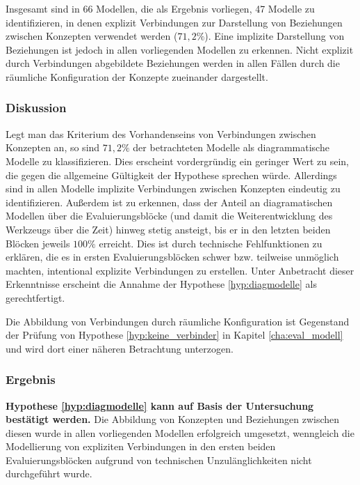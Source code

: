 Insgesamt sind in 66 Modellen, die als Ergebnis vorliegen, 47 Modelle zu identifizieren, in denen explizit Verbindungen zur Darstellung von Beziehungen zwischen Konzepten verwendet werden ($71,2\%$). Eine implizite Darstellung von Beziehungen ist jedoch in allen vorliegenden Modellen zu erkennen. Nicht explizit durch Verbindungen abgebildete Beziehungen werden in allen Fällen durch die räumliche Konfiguration der Konzepte zueinander dargestellt.

\subsubsection{Diskussion} %

Legt man das Kriterium des Vorhandenseins von Verbindungen zwischen Konzepten an, so sind $71,2\%$ der betrachteten Modelle als diagrammatische Modelle zu klassifizieren. Dies erscheint vordergründig ein geringer Wert zu sein, die gegen die allgemeine Gültigkeit der Hypothese sprechen würde. Allerdings sind in allen Modelle implizite Verbindungen zwischen Konzepten eindeutig zu identifizieren. Außerdem ist zu erkennen, dass der Anteil an diagramatischen Modellen über die Evaluierungsblöcke (und damit die Weiterentwicklung des Werkzeugs über die Zeit) hinweg stetig ansteigt, bis er in den letzten beiden Blöcken jeweils $100\%$ erreicht. Dies ist durch technische Fehlfunktionen zu erklären, die es in ersten Evaluierungsblöcken schwer bzw. teilweise unmöglich machten, intentional explizite Verbindungen zu erstellen. Unter Anbetracht dieser Erkenntnisse erscheint die Annahme der Hypothese \ref{hyp:diagmodelle} als gerechtfertigt.

Die Abbildung von Verbindungen durch räumliche Konfiguration ist Gegenstand der Prüfung von Hypothese \ref{hyp:keine_verbinder} in Kapitel \ref{cha:eval_modell} und wird dort einer näheren Betrachtung unterzogen.

\subsubsection{Ergebnis} %

\textbf{Hypothese \ref{hyp:diagmodelle} kann auf Basis der Untersuchung bestätigt werden.} Die Abbildung von Konzepten und Beziehungen zwischen diesen wurde in allen vorliegenden Modellen erfolgreich umgesetzt, wenngleich die Modellierung von expliziten Verbindungen in den ersten beiden Evaluierungsblöcken aufgrund von technischen Unzulänglichkeiten nicht durchgeführt wurde.


